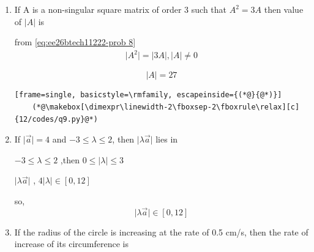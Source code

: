 \begin{enumerate}[label=\thesubsection.\arabic*, ref=\thesubsection.\theenumi]
\item 

If A is a non-singular square matrix of order 3 such that $A^{2}=3A$ then value of $\vert{A}\vert{}$ is
\begin{enumerate}
\end{enumerate}
\solution

from \eqref{eq:ee26btech11222-prob 8}
\begin{align}
\vert{A^2}\vert{} = \vert{3A}\vert{} , \vert{A}\vert{} \neq 0
\end{align}

$$\vert{A}\vert=27$$

\begin{lstlisting}[frame=single, basicstyle=\rmfamily, escapeinside={(*@}{@*)}]
	(*@\makebox[\dimexpr\linewidth-2\fboxsep-2\fboxrule\relax][c]{12/codes/q9.py}@*)
\end{lstlisting}
\item

If $\vert{}\vec{a}\vert{}=4$ and $-3\le\lambda\le2$, then $\vert{\lambda \vec{a}}\vert{}$ lies in
\begin{enumerate}
\end{enumerate}
\solution

$-3\le\lambda\le2$ ,then $0\le\vert{}\lambda\vert{}\le 3$ 

$\vert{}\lambda \vec{a}\vert{} $ , $4\vert{}\lambda\vert{} \in [0,12]$

so,$$\vert{}\lambda\vec{a}\vert{} \in [0,12]$$

\item

If the radius of the circle is increasing at the rate of 0.5 cm/s, then the rate of increase of its circumference is   


\end{enumerate}
